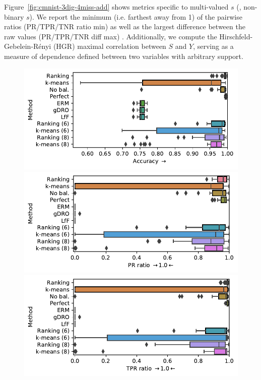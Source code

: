 Figure~\ref{fig:cmnist-3dig-4miss-add} shows metrics specific to multi-valued $s$ (\ie, non-binary $s$).
We report the minimum (i.e. farthest away from 1) of the pairwise ratios (PR/TPR/TNR ratio min) as well as the largest difference between the raw values (PR/TPR/TNR diff max) . 
Additionally, we compute the Hirschfeld-Gebelein-R\'enyi (HGR) maximal correlation \citep{renyi1959measures} between $S$ and $Y$, serving as a measure of dependence defined between two variables with arbitrary support.
\begin{figure}[htp]
  \centering
  \includegraphics[width=\columnwidth]{figures/cmnist_2v4_partial_overcluster_acc.pdf}
  \includegraphics[width=\columnwidth]{figures/cmnist_2v4_partial_overcluster_prr.pdf}
  \includegraphics[width=\columnwidth]{figures/cmnist_2v4_partial_overcluster_tprr.pdf}

\end{figure}
